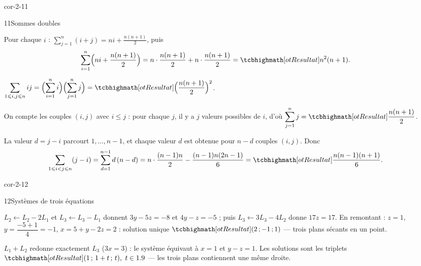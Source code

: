 \begin{blocLivre}{cor-2-11}
\begin{corrige}{11}{Sommes doubles}
\begin{questions}
  \item Pour chaque $i$ : $\displaystyle\sum_{j=1}^{n}(i+j)=ni+\frac{n(n+1)}{2}$, puis
    \[
      \sum_{i=1}^{n}\Bigl(ni+\frac{n(n+1)}{2}\Bigr)
      =n\cdot\frac{n(n+1)}{2}+n\cdot\frac{n(n+1)}{2}=\res{n^{2}(n+1)}.
    \]
  \item $\displaystyle\sum_{1\leq i,j\leq n}ij=\Bigl(\sum_{i=1}^{n}i\Bigr)\Bigl(\sum_{j=1}^{n}j\Bigr)
    =\res{\Bigl(\frac{n(n+1)}{2}\Bigr)^{2}}$.
  \item On compte les couples $(i,j)$ avec $i\leq j$ : pour chaque $j$, il y a
    $j$ valeurs possibles de $i$, d'où $\displaystyle\sum_{j=1}^{n}j=\res{\frac{n(n+1)}{2}}$.
  \item La valeur $d=j-i$ parcourt $1,\dots,n-1$, et chaque valeur $d$ est
    obtenue pour $n-d$ couples $(i,j)$. Donc
    \[
      \sum_{1\leq i<j\leq n}(j-i)=\sum_{d=1}^{n-1}d\,(n-d)
      =n\cdot\frac{(n-1)n}{2}-\frac{(n-1)n(2n-1)}{6}=\res{\frac{n(n-1)(n+1)}{6}}.
    \]
\end{questions}
\end{corrige}
\end{blocLivre}

\begin{blocLivre}{cor-2-12}
\begin{corrige}{12}{Systèmes de trois équations}
\begin{questions}
  \item $L_2\leftarrow L_2-2L_1$ et $L_3\leftarrow L_3-L_1$ donnent
    $3y-5z=-8$ et $4y-z=-5$ ; puis $L_3\leftarrow3L_3-4L_2$ donne $17z=17$.
    En remontant : $z=1$, $y=\dfrac{-5+1}{4}=-1$, $x=5+y-2z=2$ :
    solution unique $\res{(2\,;-1\,;1)}$ — trois plans sécants en un point.
  \item $L_1+L_2$ redonne exactement $L_3$ ($3x=3$) : le système équivaut à
    $x=1$ et $y-z=1$. Les solutions sont les triplets
    $\res{(1\,;\,1+t\,;\,t),\ t\in\R}$ — les trois plans contiennent une même
    droite.
\end{questions}
\end{corrige}
\end{blocLivre}

